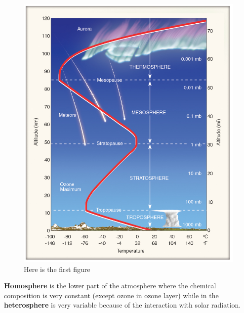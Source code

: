 \documentclass[oneside]{book}
\begin{document}
\begin{figure}

{\centering \includegraphics[width=0.8\linewidth]{figures/Figure13} 

}

\caption{Here is the first figure}\label{fig:Layer2}
\end{figure}

\textbf{Homosphere} is the lower part of the atmosphere where the
chemical composition is very constant (except ozone in ozone layer)
while in the \textbf{heterosphere} is very variable because of the
interaction with solar radiation.
\end{document}
